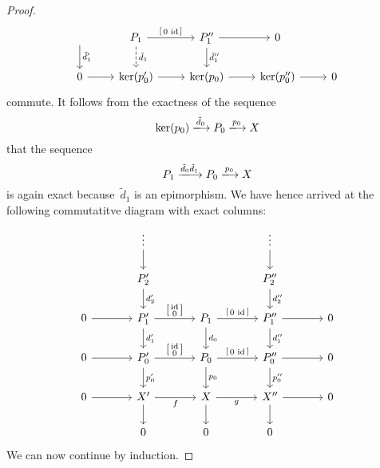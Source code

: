 \begin{proof}
\[\begin{tikzcd}[ampersand replacement = \&]
          \arrow{d}[right]{\tilde{d}'_1}
      \&  P_1
          \arrow{r}[above]{\begin{bsmallmatrix} 0 & \id \end{bsmallmatrix}}
          \arrow[dashed]{d}[right]{\tilde{d}_1}
      \&  P''_1
          \arrow{r}
          \arrow{d}[right]{\tilde{d}''_1}
      \&  0
      \\
          0
          \arrow{r}
      \&  \ker(p'_0)
          \arrow{r}
      \&  \ker(p_0)
          \arrow{r}
      \&  \ker(p''_0)
          \arrow{r}
      \&  0
    \end{tikzcd}
  \]
  commute.
  It follows from the exactness of the sequence
  \[
    \ker(p_0)
    \xlongto{\tilde{d}_0}
    P_0
    \xlongto{p_0}
    X
  \]
  that the sequence
  \[
    P_1
    \xlongto{\tilde{d}_0 \tilde{d}_1}
    P_0
    \xlongto{p_0}
    X
  \]
  is again exact because~$\tilde{d}_1$ is an epimorphism.
  We have hence arrived at the following commutatitve diagram with exact columns:
  \[
    \begin{tikzcd}[ampersand replacement = \&, column sep = large]
          {}
      \&  \vdots
          \arrow{d}
      \&  {}
      \&  \vdots
          \arrow{d}
      \&  {}
      \\
          {}
      \&  P'_2
          \arrow{d}[right]{d'_2}
      \&  {}
      \&  P''_2
          \arrow{d}[right]{d''_2}
      \&  {}
      \\
          0
          \arrow{r}
      \&  P'_1
          \arrow{r}[above]{\begin{bsmallmatrix} \id \\ 0 \end{bsmallmatrix}}
          \arrow{d}[right]{d'_1}
      \&  P_1
          \arrow{r}[above]{\begin{bsmallmatrix} 0 & \id \end{bsmallmatrix}}
          \arrow{d}[right]{d_0}
      \&  P''_1
          \arrow{r}
          \arrow{d}[right]{d''_1}
      \& 0
      \\
          0
          \arrow{r}
      \&  P'_0
          \arrow{r}[above]{\begin{bsmallmatrix} \id \\ 0 \end{bsmallmatrix}}
          \arrow{d}[right]{p'_0}
      \&  P_0
          \arrow{r}[above]{\begin{bsmallmatrix} 0 & \id \end{bsmallmatrix}}
          \arrow{d}[right]{p_0}
      \&  P''_0
          \arrow{r}
          \arrow{d}[right]{p''_0}
      \&  0
      \\
          0
          \arrow{r}
      \&  X'
          \arrow{r}[below]{f}
          \arrow{d}
      \&  X
          \arrow{r}[below]{g}
          \arrow{d}
      \&  X''
          \arrow{r}
          \arrow{d}
      \&  0
      \\
          {}
      \&  0
      \&  0
      \&  0
      \&  {}
    \end{tikzcd}
  \]
  We can now continue by induction.
\end{proof}


